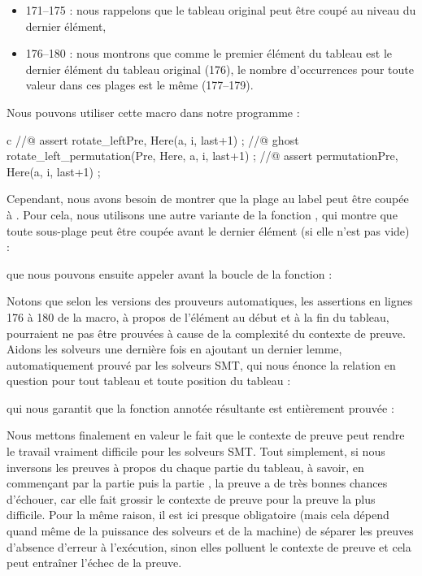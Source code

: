 \begin{itemize}
    \item 171--175 : nous rappelons que le tableau original peut être coupé au
          niveau du dernier élément,
    \item 176--180 : nous montrons que comme le premier élément du tableau est le 
          dernier élément du tableau original (176), le nombre d'occurrences pour
          toute valeur dans ces plages est le même (177--179).
\end{itemize}


Nous pouvons utiliser cette macro dans notre programme :


\begin{CodeBlock}{c}
//@ assert rotate_left{Pre, Here}(a, i, last+1) ;
//@ ghost rotate_left_permutation(Pre, Here, a, i, last+1) ;
//@ assert permutation{Pre, Here}(a, i, last+1) ;
\end{CodeBlock}


Cependant, nous avons besoin de montrer que la plage au label  peut
être coupée à  . Pour cela, nous utilisons une autre variante de la
fonction , qui montre que toute sous-plage peut être coupée avant
le dernier élément (si elle n'est pas vide) :




que nous pouvons ensuite appeler avant la boucle de la fonction  :




Notons que selon les versions des prouveurs automatiques, les assertions en lignes
176 à 180 de la macro, à propos de l'élément au début et à la fin du tableau,
pourraient ne pas être prouvées à cause de la complexité du contexte de preuve.
Aidons les solveurs une dernière fois en ajoutant un dernier lemme, automatiquement
prouvé par les solveurs SMT, qui nous énonce la relation en question pour tout
tableau et toute position du tableau :




qui nous garantit que la fonction annotée résultante est entièrement prouvée :




Nous mettons finalement en valeur le fait que le contexte de preuve peut rendre
le travail vraiment difficile pour les solveurs SMT. Tout simplement, si nous 
inversons les preuves à propos du chaque partie du tableau, à savoir, en
commençant par la partie  puis la partie ,
la preuve a de très bonnes chances d'échouer, car elle fait grossir le contexte de
preuve pour la preuve la plus difficile. Pour la même raison, il est ici presque
obligatoire (mais cela dépend quand même de la puissance des solveurs et de la
machine) de séparer les preuves d'absence d'erreur à l'exécution, sinon elles
polluent le contexte de preuve et cela peut entraîner l'échec de la preuve.


